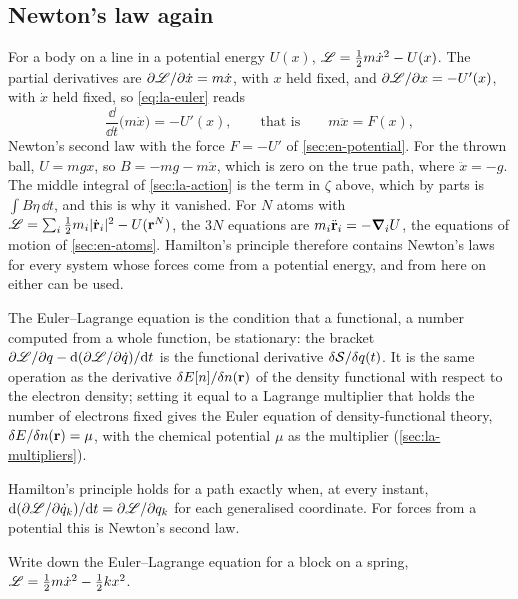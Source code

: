 \subsection*{Newton's law again}

For a body on a line in a potential energy $U(x)$, $\mathscr{L} = \frac12 m
\dot{x}^2 - U(x)$. The partial derivatives are $\partial\mathscr{L}/\partial
\dot{x} = m\dot{x}$, with $x$ held fixed, and $\partial\mathscr{L}/\partial x =
-U'(x)$, with $\dot{x}$ held fixed, so \cref{eq:la-euler} reads
\begin{equation*}
   \frac{\dd}{\dd t}\bigl(m\dot{x}\bigr) = -U'(x) ,
   \qquad\text{that is}\qquad m\ddot{x} = F(x) ,
\end{equation*}
Newton's second law with the force $F = -U'$ of \cref{sec:en-potential}.
For the thrown ball, $U = mgx$, so $B = -mg - m\ddot{x}$, which is zero on
the true path, where $\ddot{x} = -g$. The middle integral of
\cref{sec:la-action} is the term in $\zeta$ above, which by parts is $\int
B\eta\,\dd t$, and this is why it vanished. For $N$ atoms with
$\mathscr{L} = \sum_i\frac12 m_i\lvert\dot{\bm{\mathrm{r}}}_i\rvert^2 - U(\bm{\mathrm{r}}^N)$, the
$3N$ equations are $m_i\ddot{\bm{\mathrm{r}}}_i = -\bm{\nabla}_iU$, the equations of
motion of \cref{sec:en-atoms}. Hamilton's principle therefore contains
Newton's laws for every system whose forces come from a potential energy,
and from here on either can be used.

\begin{bridge}
The Euler--Lagrange equation is the condition that a functional, a number
computed from a whole function, be stationary: the bracket $\partial\mathscr{L}/
\partial q - \mathrm{d}(\partial\mathscr{L}/\partial\dot{q})/\mathrm{d} t$ is the functional
derivative $\delta\mathcal{S}/\delta q(t)$. It is the same operation as the
derivative $\delta E[n]/\delta n(\bm{\mathrm{r}})$ of the density functional with
respect to the electron density; setting it equal to a Lagrange
multiplier that holds the number of electrons fixed gives the Euler
equation of density-functional theory, $\delta E/\delta n(\bm{\mathrm{r}}) = \mu$,
with the chemical potential $\mu$ as the
multiplier\cite{Parr1978} (\cref{sec:la-multipliers}).
\end{bridge}

\begin{keyidea}
Hamilton's principle holds for a path exactly when, at every instant,
$\mathrm{d}(\partial\mathscr{L}/\partial\dot{q}_k)/\mathrm{d} t = \partial\mathscr{L}/\partial q_k$
for each generalised coordinate. For forces from a potential this is
Newton's second law.
\end{keyidea}

\begin{selfcheck}
Write down the Euler--Lagrange equation for a block on a spring, $\mathscr{L} =
\frac12 m\dot{x}^2 - \frac12 kx^2$.
\end{selfcheck}
